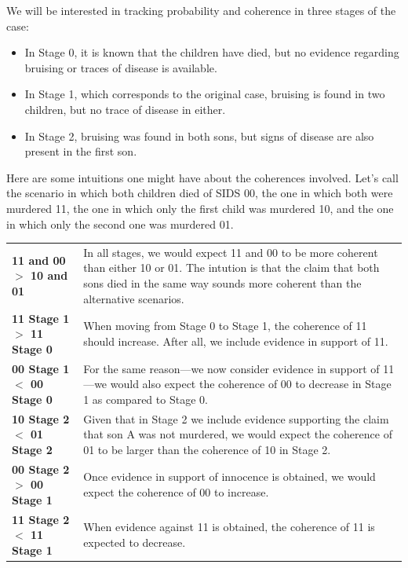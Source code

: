 \documentclass[10pt,]{scrartcl}
\begin{document}
We will be interested in tracking probability and coherence in three stages of the case: 
\begin{itemize} 
\item In \textsf{Stage 0}, it is known that the children have died, but no evidence regarding bruising or traces of disease is available.

\item In \textsf{Stage 1}, which corresponds to the original case, bruising is found in two children, but no trace of disease in either.

\item In \textsf{Stage 2}, bruising was found in both sons, but signs of disease are also present in the first son. 
\end{itemize}












Here  are some intuitions one might have about the coherences involved. Let's call the scenario in which both children died of SIDS 00, the one in which both were murdered 11, the one in which only the first child was murdered 10, and the one in which only the second one was murdered 01.

\begin{tabular}{lp{8cm}}
 \textbf{11 and 00 $>$  10 and 01} & In all stages, we would expect 11 and 00 to be more coherent than either 10 or 01. The intution is that the claim that both sons died in the same way sounds more coherent than the alternative scenarios.  \\ 
\textbf{11 Stage 1 $>$ 11 Stage 0} & When moving from Stage 0 to Stage 1, the coherence of 11 should increase. After all, we include evidence in support of 11. \\
\textbf{00 Stage 1 $<$ 00 Stage 0} &  For the same reason---we now consider evidence in support of 11---we would also expect the coherence of 00 to decrease in \textsf{Stage 1} as compared to \textsf{Stage 0}. \\
\textbf{10 Stage 2 $<$ 01 Stage 2} &
Given that in Stage 2 we include evidence supporting the claim that son A was not murdered, we would  expect the coherence of 01 to be larger than the coherence of 10 in Stage 2.\\
\textbf{00 Stage 2 $>$ 00 Stage 1} & Once evidence in support of innocence is obtained, we would expect the coherence of 00 to increase.\\
\textbf{11 Stage 2 $<$ 11 Stage 1} & When evidence against 11 is obtained, the coherence of 11 is expected to decrease.
\end{tabular}
\end{document}
